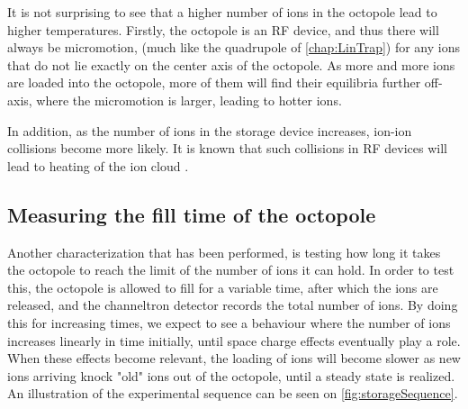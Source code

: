 It is not surprising to see that a higher number of ions in the octopole lead to higher temperatures. Firstly, the octopole is an RF device, and thus there will always be micromotion,
 (much like the quadrupole of \cref{chap:LinTrap}) for any ions that do not lie exactly on the center axis of the octopole. 
As more and more ions are loaded into the octopole, more of them will find their equilibria further off-axis, where the micromotion is larger, leading to hotter ions.

In addition, as the number of ions in the storage device increases, ion-ion collisions become more likely. It is known that such collisions in RF devices will lead to heating of the ion cloud \cite{BlumelHeating,MichaelIonIonHeating}.


\subsection{Measuring the fill time of the octopole}
Another characterization that has been performed, is testing how long it takes the octopole to reach the limit of the number of ions it can hold.
In order to test this, the octopole is allowed to fill for a variable time, after which the ions are released, and the channeltron detector records the total number of ions.
By doing this for increasing times, we expect to see a behaviour where the number of ions increases linearly in time initially, until space charge effects  eventually play a role.
When these effects become relevant, the loading of ions will become slower as new ions arriving knock "old" ions out of the octopole, until a steady state is realized.
An illustration of the experimental sequence can be seen on \cref{fig:storageSequence}. 

